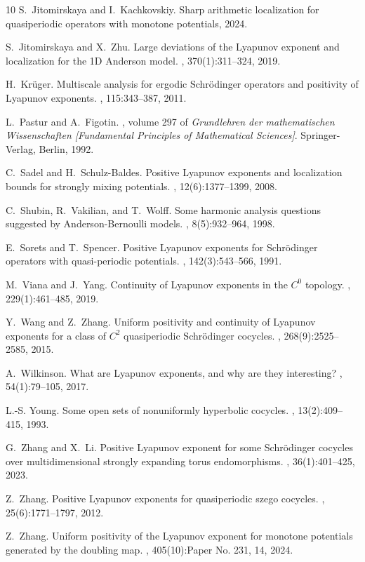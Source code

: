 \documentclass{amsart}
\begin{document}
\begin{thebibliography}{10}
S.~Jitomirskaya and I.~Kachkovskiy.
\newblock Sharp arithmetic localization for quasiperiodic operators with monotone potentials, 2024.

S.~Jitomirskaya and X.~Zhu.
\newblock Large deviations of the {L}yapunov exponent and localization for the 1{D} {A}nderson model.
, 370(1):311--324, 2019.

H.~Kr\"uger.
\newblock Multiscale analysis for ergodic {S}chr\"odinger operators and positivity of {L}yapunov exponents.
, 115:343--387, 2011.

L.~Pastur and A.~Figotin.
, volume 297 of {\em Grundlehren der mathematischen Wissenschaften [Fundamental Principles of Mathematical Sciences]}.
\newblock Springer-Verlag, Berlin, 1992.

C.~Sadel and H.~Schulz-Baldes.
\newblock Positive {L}yapunov exponents and localization bounds for strongly mixing potentials.
, 12(6):1377--1399, 2008.

C.~Shubin, R.~Vakilian, and T.~Wolff.
\newblock Some harmonic analysis questions suggested by {A}nderson-{B}ernoulli models.
, 8(5):932--964, 1998.

E.~Sorets and T.~Spencer.
\newblock Positive {L}yapunov exponents for {S}chr\"odinger operators with quasi-periodic potentials.
, 142(3):543--566, 1991.

M.~Viana and J.~Yang.
\newblock Continuity of {L}yapunov exponents in the {$C^0$} topology.
, 229(1):461--485, 2019.

Y.~Wang and Z.~Zhang.
\newblock Uniform positivity and continuity of {L}yapunov exponents for a class of {$C^2$} quasiperiodic {S}chr\"odinger cocycles.
, 268(9):2525--2585, 2015.

A.~Wilkinson.
\newblock What are {L}yapunov exponents, and why are they interesting?
, 54(1):79--105, 2017.

L.-S. Young.
\newblock Some open sets of nonuniformly hyperbolic cocycles.
, 13(2):409--415, 1993.

G.~Zhang and X.~Li.
\newblock Positive {L}yapunov exponent for some {S}chr\"odinger cocycles over multidimensional strongly expanding torus endomorphisms.
, 36(1):401--425, 2023.

Z.~Zhang.
\newblock Positive {L}yapunov exponents for quasiperiodic szego cocycles.
, 25(6):1771--1797, 2012.

Z.~Zhang.
\newblock Uniform positivity of the {L}yapunov exponent for monotone potentials generated by the doubling map.
, 405(10):Paper No. 231, 14, 2024.

\end{thebibliography}
\end{document}
